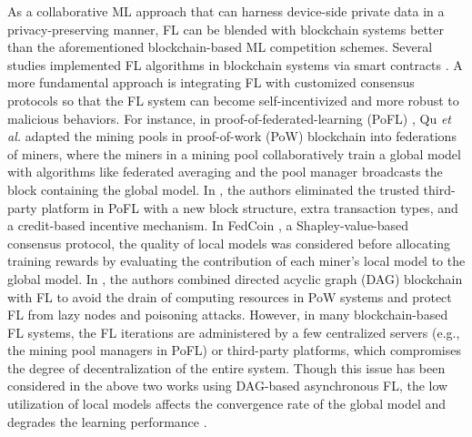 As a collaborative ML approach that can harness device-side private
data in a privacy-preserving manner, FL can be blended with blockchain
systems better than the aforementioned blockchain-based ML competition
schemes. Several studies implemented FL algorithms in blockchain systems
via smart contracts \cite{Toyoda2019,Ramanan2020}. A more fundamental
approach is integrating FL with customized consensus protocols so
that the FL system can become self-incentivized and more robust to
malicious behaviors. For instance,  in proof-of-federated-learning
(PoFL) \cite{Qu2021}, Qu \emph{et al.} adapted the mining pools in
proof-of-work (PoW) blockchain into federations of miners, where the
miners in a mining pool collaboratively train a global model with
algorithms like federated averaging and the pool manager broadcasts
the block containing the global model.  In \cite{Wang2022}, the
authors eliminated the trusted third-party platform in PoFL with a
new block structure, extra transaction types, and a credit-based incentive
mechanism. In FedCoin \cite{Liu2020fedcoin}, a Shapley-value-based
consensus protocol, the quality of local models was considered before
allocating training rewards by evaluating the contribution of each
miner's local model to the global model.  In \cite{Cao2023,Ying2023},
the authors combined directed acyclic graph (DAG) blockchain with
FL to avoid the drain of computing resources in PoW systems and protect
FL from lazy nodes and poisoning attacks.   However, in many blockchain-based
FL systems, the FL iterations are administered by a few centralized
servers (e.g., the mining pool managers in PoFL) or  third-party
platforms, which compromises the degree of decentralization of the
entire system. Though this issue has been considered in the above
two works using DAG-based asynchronous FL, the low utilization of
local models affects the convergence rate of the global model and
degrades the learning performance \cite{Zhang2024c}.

